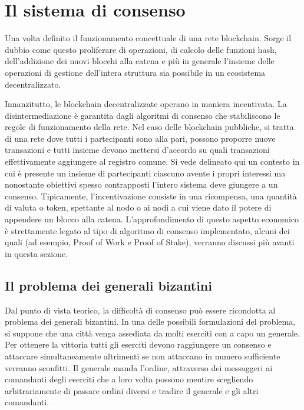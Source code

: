 \section{Il sistema di consenso} %

Una volta definito il funzionamento concettuale di una rete blockchain. Sorge il dubbio come questo proliferare di operazioni, di calcolo delle funzioni hash, dell'addizione dei nuovi blocchi alla catena e più in generale l'insieme delle operazioni di gestione dell'intera struttura sia possibile in un ecosistema decentralizzato. 

Innanzitutto, le blockchain decentralizzate operano in maniera incentivata. La disintermediazione è garantita dagli algoritmi di consenso che stabiliscono le regole di funzionamento della rete. Nel caso delle blockchain pubbliche, si tratta di una rete dove tutti i partecipanti sono alla pari, possono proporre nuove transazioni e tutti insieme devono mettersi d'accordo su quali transazioni effettivamente aggiungere al registro comune. Si vede delineato qui un contesto in cui è presente un insieme di partecipanti ciascuno avente i propri interessi ma nonostante obiettivi spesso contrapposti l'intero sistema deve giungere a un consenso. Tipicamente, l'incentivazione consiste in una ricompensa, una quantità di valuta o token, spettante al nodo o ai nodi a cui viene dato il potere di appendere un blocco alla catena. L’approfondimento di questo aspetto economico è strettamente legato al tipo di algoritmo di consenso implementato, alcuni dei quali (ad esempio, Proof of Work e Proof of Stake), verranno discussi più avanti in questa sezione.

\subsection{Il problema dei generali bizantini}

Dal punto di vista teorico, la difficoltà di consenso può essere ricondotta al problema dei generali bizantini. In una delle possibili formulazioni del problema, si suppone che una città venga assediata da molti eserciti con a capo un generale. Per ottenere la vittoria tutti gli eserciti devono raggiungere un consenso e attaccare simultaneamente altrimenti se non attaccano in numero sufficiente verranno sconfitti. Il generale manda l’ordine, attraverso dei messaggeri ai comandanti degli eserciti che a loro volta possono mentire scegliendo arbitrariamente di passare ordini diversi e tradire il generale e gli altri comandanti.

